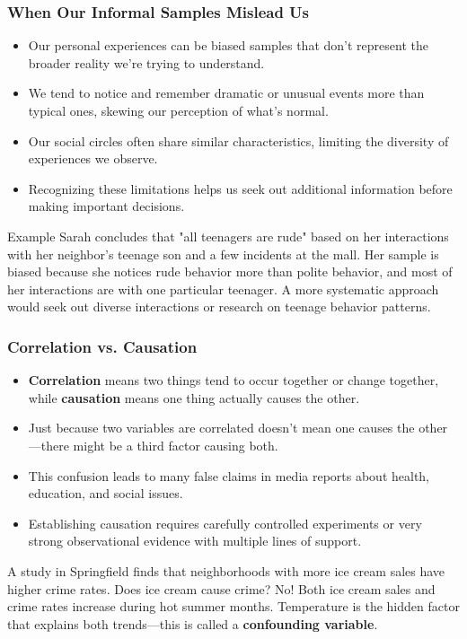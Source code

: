 \documentclass{beamer}
\begin{document}
	\begin{frame}
		\frametitle{When Our Informal Samples Mislead Us}
		
		\begin{itemize}
			\item Our personal experiences can be biased samples that don't represent the broader reality we're trying to understand.
			\item We tend to notice and remember dramatic or unusual events more than typical ones, skewing our perception of what's normal.
			\item Our social circles often share similar characteristics, limiting the diversity of experiences we observe.
			\item Recognizing these limitations helps us seek out additional information before making important decisions.
		\end{itemize}
		
		\begin{exampleblock}{Example}
			Sarah concludes that "all teenagers are rude" based on her interactions with her neighbor's teenage son and a few incidents at the mall. Her sample is biased because she notices rude behavior more than polite behavior, and most of her interactions are with one particular teenager. A more systematic approach would seek out diverse interactions or research on teenage behavior patterns.
		\end{exampleblock}
		
	\end{frame}


\begin{frame}
	\frametitle{Correlation vs. Causation}
	
	\begin{itemize}
		\item \textbf{Correlation} means two things tend to occur together or change together, while \textbf{causation} means one thing actually causes the other.
		\item Just because two variables are correlated doesn't mean one causes the other—there might be a third factor causing both.
		\item This confusion leads to many false claims in media reports about health, education, and social issues.
		\item Establishing causation requires carefully controlled experiments or very strong observational evidence with multiple lines of support.
	\end{itemize}
	
	\begin{example}
		A study in Springfield finds that neighborhoods with more ice cream sales have higher crime rates. Does ice cream cause crime? No! Both ice cream sales and crime rates increase during hot summer months. Temperature is the hidden factor that explains both trends—this is called a \textbf{confounding variable}.
	\end{example}
	
\end{frame}
\end{document}

